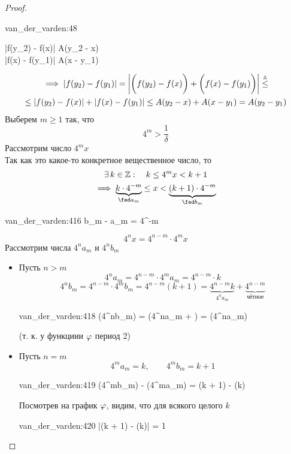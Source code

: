 \begin{proof}
\begin{itemize}
\begin{equ}{van_der_varden:48}
\begin{cases}
				|f(y_2) - f(x)| \le A(y_2 - x) \\
				|f(x) - f(y_1)| \le A(x - y_1)
			\end{cases}
		\end{equ}
		\begin{multline*}
			\implies |f(y_2) - f(y_1)| = \bigg| \bigg( f(y_2) - f(x) \bigg) + \bigg( f(x) - f(y_1) \bigg) \bigg| \stackrel\vartriangle\le \\
			\le |f(y_2) - f(x)| + |f(x) - f(y_1)| \le A(y_2 - x) + A(x - y_1) = A(y_2 - y_1)
		\end{multline*}
		Выберем $ m \ge 1 $ так, что
		$$ 4^m > \frac1\delta $$
		Рассмотрим число $ 4^mx $ \\
		Так как это какое-то конкретное вещественное число, то
		$$ \exists\, k \in \mathbb{Z} : \quad k \le 4^mx < k + 1 $$
		$$ \implies \underbrace{k \cdot 4^{-m}}_{\fed a_m} \le x < \underbrace{(k + 1) \cdot 4^{-m}}_{\fed b_m} $$
		\begin{equ}{van_der_varden:416}
			b_m - a_m = 4^{-m}
		\end{equ}
		$$ 4^nx = 4^{n - m} \cdot 4^mx $$
		Рассмотрим числа $ 4^na_m $ и $ 4^nb_m $
		\begin{itemize}
			\item Пусть $ n > m $
			$$ 4^na_m = 4^{n - m} \cdot 4^ma_m = 4^{n - m} \cdot k $$
			$$ 4^nb_m = 4^{n - m} \cdot 4^mb_m = 4^{n - m}(k + 1) = \underbrace{4^{n - m}k}_{4^na_m} + \underbrace{4^{n - m}}_{\text{чётное}} $$
			\begin{equ}{van_der_varden:418}
				\implies \vphi(4^nb_m) = \vphi(4^na_m + ) = \vphi(4^na_m)
			\end{equ}
			(т. к. у функциии $ \varphi $ период 2)

			\item Пусть $ n = m $
			$$ 4^ma_m = k, \qquad 4^mb_m = k + 1 $$
			\begin{equ}{van_der_varden:419}
				\vphi(4^mb_m) - \vphi(4^ma_m) = \vphi(k + 1) - \vphi(k)
			\end{equ}
			Посмотрев на график $ \varphi $, видим, что для всякого целого $ k $
			\begin{equ}{van_der_varden:420}
				|\vphi(k + 1) - \vphi(k)| = 1
			\end{equ}


\end{itemize}
\end{itemize}
\end{proof}
